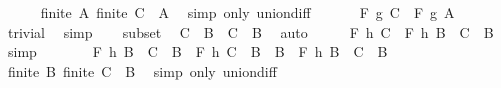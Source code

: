 \begin{isabellebody}
\ \ \ \ \isamarkupfalse%
\ {\isacartoucheopen}finite\ A{\isacartoucheclose}\ {\isacartoucheopen}finite\ {\isacharparenleft}{\kern0pt}C\ {\isacharminus}{\kern0pt}\ A{\isacharparenright}{\kern0pt}{\isacartoucheclose}\ \isamarkupfalse%
\ {\isacharparenleft}{\kern0pt}simp\ only{\isacharcolon}{\kern0pt}\ union{\isacharunderscore}{\kern0pt}diff{}{\isacharparenright}{\kern0pt}\isanewline
\ \ \isamarkupfalse%
\ \isamarkupfalse%
\ {\isacharasterisk}{\kern0pt}{\isacharcolon}{\kern0pt}\ {\isachardoublequoteopen}F\ g\ C\ {\isacharequal}{\kern0pt}\ F\ g\ A{\isachardoublequoteclose}\ \isamarkupfalse%
\ trivial\ \isamarkupfalse%
\ simp\isanewline
\ \ \isamarkupfalse%
\ subset\ \isamarkupfalse%
\ {\isachardoublequoteopen}C\ {\isacharequal}{\kern0pt}\ B\ {\isasymunion}\ {\isacharparenleft}{\kern0pt}C\ {\isacharminus}{\kern0pt}\ B{\isacharparenright}{\kern0pt}{\isachardoublequoteclose}\ \isamarkupfalse%
\ auto\isanewline
\ \ \isamarkupfalse%
\ \isamarkupfalse%
\ {\isachardoublequoteopen}F\ h\ C\ {\isacharequal}{\kern0pt}\ F\ h\ {\isacharparenleft}{\kern0pt}B\ {\isasymunion}\ {\isacharparenleft}{\kern0pt}C\ {\isacharminus}{\kern0pt}\ B{\isacharparenright}{\kern0pt}{\isacharparenright}{\kern0pt}{\isachardoublequoteclose}\ \isamarkupfalse%
\ simp\isanewline
\ \ \isamarkupfalse%
\ \isamarkupfalse%
\ {\isachardoublequoteopen}{\isasymdots}\ {\isacharequal}{\kern0pt}\ F\ h\ {\isacharparenleft}{\kern0pt}B\ {\isacharminus}{\kern0pt}\ {\isacharparenleft}{\kern0pt}C\ {\isacharminus}{\kern0pt}\ B{\isacharparenright}{\kern0pt}{\isacharparenright}{\kern0pt}\ \isactrlbold {\isacharasterisk}{\kern0pt}\ F\ h\ {\isacharparenleft}{\kern0pt}C\ {\isacharminus}{\kern0pt}\ B\ {\isacharminus}{\kern0pt}\ B{\isacharparenright}{\kern0pt}\ \isactrlbold {\isacharasterisk}{\kern0pt}\ F\ h\ {\isacharparenleft}{\kern0pt}B\ {\isasyminter}\ {\isacharparenleft}{\kern0pt}C\ {\isacharminus}{\kern0pt}\ B{\isacharparenright}{\kern0pt}{\isacharparenright}{\kern0pt}{\isachardoublequoteclose}\isanewline
\ \ \ \ \isamarkupfalse%
\ {\isacartoucheopen}finite\ B{\isacartoucheclose}\ {\isacartoucheopen}finite\ {\isacharparenleft}{\kern0pt}C\ {\isacharminus}{\kern0pt}\ B{\isacharparenright}{\kern0pt}{\isacartoucheclose}\ \isamarkupfalse%
\ {\isacharparenleft}{\kern0pt}simp\ only{\isacharcolon}{\kern0pt}\ union{\isacharunderscore}{\kern0pt}diff{}{\isacharparenright}{\kern0pt}\isanewline

\end{isabellebody}
